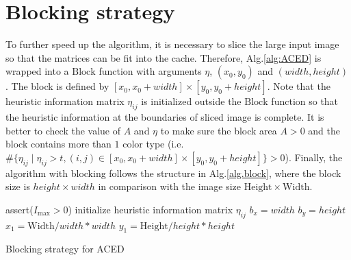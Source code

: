 \documentclass[letterpaper]{article}
\begin{document}
\section{Blocking strategy}\label{sec:yourmethod}
To further speed up the algorithm, it is necessary to slice the large input image so that the matrices can be fit into the cache. Therefore, Alg.\ref{alg:ACED} is wrapped into a $\mathrm{Block}$ function with arguments $\eta$, $(x_0,y_0)$ and $(width, height)$. The block is defined by $[x_0,x_0+width]\times[y_0,y_0+height]$. Note that the heuristic information matrix $\eta_{ij}$ is initialized outside the $\mathrm{Block}$ function so that the heuristic information at the boundaries of sliced image is complete. It is better to check the value of $A$ and $\eta$ to make sure the block area $A>0$ and the block contains more than $1$ color type (i.e. $\#\{\eta_{ij}\mid\eta_{ij}>t, (i,j)\in[x_0,x_0+width]\times[y_0,y_0+height]\}>0$). Finally, the algorithm with blocking follows the structure in Alg.\ref{alg.block}, where the block size is $height\times width$ in comparison with the image size $\mathrm{Height}\times\mathrm{Width}$. 
\begin{algorithm}
	assert($I_{\max}>0$)\;
	initialize heuristic information matrix $\eta_{ij}$\; 
	$b_x=width$\;
	$b_y=height$\;
	$x_1=\mathrm{Width}/width*width$\;
	$y_1=\mathrm{Height}/height*height$\;
	\caption{Blocking strategy for ACED}\label{alg.block}
\end{algorithm}    
%
\end{document}
